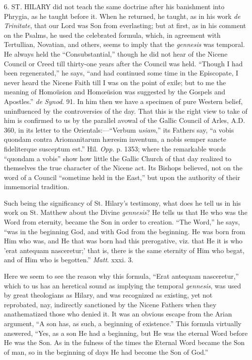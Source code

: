 6. ST. HILARY did not
teach the same doctrine after his banishment into Phrygia, as he
taught before it. When he returned, he taught, as in his work \emph{de
Trinitate}, that our Lord was Son from everlasting; but at first,
as in his comment on the Psalms, he used the celebrated formula,
which, in agreement with Tertullian, Novatian, and others, seems to
imply that the \emph{gennesis} was temporal. He always held the
``Consubstantial,'' though he did not hear of the Nicene
Council or Creed till thirty-one years after the Council was held.
``Though I had been regenerated,'' he says, ``and had
continued some time in the Episcopate, I never heard the Nicene Faith
till I was on the point of exile; but to me the meaning of Homoüsion
and Homœüsion was suggested by the Gospels and Apostles.'' \emph{de
Synod}. 91. In him then we have a specimen of pure Western belief,
uninfluenced by the controversies of the day. That this is the right
view to take of him is confirmed to us by the parallel avowal of the
Gallic Council of Arles, A.D. 360, in its letter
to the Orientals:—``Verbum \emph{usiam},'' its Fathers say,
``a vobis quondam contra Ariomanitarum hæresim inventum, a nobis
semper sancte fideliterque susceptum est.'' Hil. \emph{Opp}. p.
1353; where the remarkable words ``quondam a vobis'' show how
little the Gallic Church of that day realized to themselves the true
character of the Nicene act. Its Bishops believed, not on the word of
a Council ``sometime held in the East,'' but upon the
authority of their immemorial tradition.

Such being the significancy of St. Hilary's testimony, what does he
tell us in his work on St. Matthew about the Divine \emph{gennesis}?
He tells us that He who was the Word from eternity, became the Son in
order to creation. ``The Word,'' he says, ``was in the
beginning God, and with God from the beginning. He was born from Him
who was, and He that was born had this prerogative, viz. that He it is
who 'erat antequam nasceretur;' that is, there is the same eternity of
Him who begat, and of Him who is begotten.'' \emph{Matt}. xxxi. 3.

Here we seem to see the reason why this formula, ``Erat
antequam nasceretur,'' which to us has an heretical sound as
implying the temporal \emph{gennesis}, was used by great theologians
as Hilary, and was recognized as existing, yet not reprobated, nay,
indirectly sanctioned by the Nicene Fathers when they anathematized
those who denied it. It was an obvious escape from the Arian argument,
``A son has, as such, a beginning of existence.'' This formula
virtually answered, ``Yes, as a son He had a beginning, but He was
the eternal Word before He was the Son. As in the fulness of the times
the Eternal Word became the Son of man, so in the beginning of days He
had become the Son of God.''

